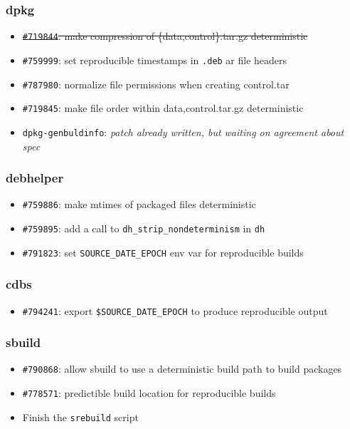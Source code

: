 \documentclass[14pt,aspectratio=169]{beamer}
\begin{document}
\begin{frame}
 \frametitle{dpkg}

 \begin{itemize}\small
  \item \sout{\texttt{\#719844}: make compression of \{data,control\}.tar.gz deterministic}
  \item \texttt{\#759999}: set reproducible timestamps in \texttt{.deb} ar file headers
  \item \texttt{\#787980}: normalize file permissions when creating control.tar
  \item \texttt{\#719845}: make file order within {data,control}.tar.gz deterministic
  \item \texttt{dpkg-genbuldinfo}: \textit{patch already written, but waiting on agreement about spec}
 \end{itemize}
\end{frame}

\begin{frame}
 \frametitle{debhelper}

 \begin{itemize}\small
  \item \texttt{\#759886}: make mtimes of packaged files deterministic
  \item \texttt{\#759895}: add a call to \texttt{dh\_strip\_nondeterminism} in \texttt{dh}
  \item \texttt{\#791823}: set \texttt{SOURCE\_DATE\_EPOCH} env var for reproducible builds
 \end{itemize}
\end{frame}

\begin{frame}
 \frametitle{cdbs}

 \begin{itemize}\small
  \item \texttt{\#794241}: export \texttt{\$SOURCE\_DATE\_EPOCH} to produce reproducible output
 \end{itemize}
\end{frame}

\begin{frame}
 \frametitle{sbuild}

 \begin{itemize}\small
  \item \texttt{\#790868}: allow sbuild to use a deterministic build path to build packages
  \item \texttt{\#778571}: predictible build location for reproducible builds
  \item Finish the \texttt{srebuild} script
 \end{itemize}
\end{frame}
\end{document}
